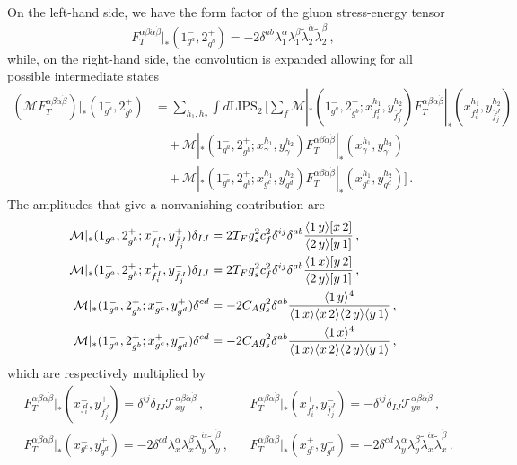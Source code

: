 On the left-hand side, we have the form factor of the gluon stress-energy tensor 
\begin{equation}
    F_T^{\alpha\beta\dot\alpha\dot\beta}|_{*}(1^-_{g^a},2^+_{g^b}) = -2 \delta^{ab} \lambda_1^\alpha \lambda_1^\beta \tilde\lambda_2^{\dot\alpha} \tilde\lambda_2^{\dot\beta}\,,
\end{equation}
while, on the right-hand side, the convolution is expanded allowing for all possible intermediate states
\begin{align}
    (\mathcal M F_T^{\alpha\beta\dot\alpha\dot\beta})|_{*}(1^-_{g^a},2^+_{g^b}) &= \sum_{h_1,h_2}\int d\text{LIPS}_2\,
    \bigg[
    \sum_f  \mathcal M|_{*} (1^-_{g^a},2^+_{g^b}; x_{f_i^I}^{h_1},y_{\bar f_j^J}^{h_2})F_T^{\alpha\beta\dot\alpha\dot\beta}|_{*}(x_{f_i^I}^{h_1},y_{\bar f_j^J}^{h_2})\nonumber \\
    &\quad + \mathcal M|_{*} (1^-_{g^a},2^+_{g^b}; x_\gamma^{h_1},y_\gamma^{h_2})F_T^{\alpha\beta\dot\alpha\dot\beta}|_{*}(x_\gamma^{h_1},y_\gamma^{h_2})\nonumber \\
    &\quad + \mathcal M|_{*} (1^-_{g^a},2^+_{g^b}; x_{g^c}^{h_1},y_{g^d}^{h_2})F_T^{\alpha\beta\dot\alpha\dot\beta}|_{*}(x_{g^c}^{h_1},y_{g^d}^{h_2})
    \bigg]\,.
\end{align}
The amplitudes that give a nonvanishing contribution are
\begin{align}
    \mathcal M|_*(1^-_{g^a},2^+_{g^b};x_{f_i^I}^{-},y_{\bar f_j^J}^{+})\delta_{IJ} &= 2T_Fg_s^2c_f^2\delta^{ij}\delta^{ab}\frac{\langle1\, y \rangle\lbrack x\, 2 \rbrack}{\langle2\, y \rangle\lbrack y\, 1 \rbrack}\,, \\
    \mathcal M|_*(1^-_{g^a},2^+_{g^b};x_{f_i^I}^{+},y_{\bar f_j^J}^{-})\delta_{IJ} &= 2T_Fg_s^2c_f^2\delta^{ij}\delta^{ab}\frac{\langle1\, x \rangle\lbrack y\, 2 \rbrack}{\langle2\, y \rangle\lbrack y\, 1 \rbrack}\,,\\
    \mathcal M|_* (1^-_{g^a},2^+_{g^b};x_{g^c}^{-},y_{g^d}^{+}) \delta^{cd} &= -2C_A g_s^2\delta^{ab}\frac{\langle1\, y \rangle^4}{\langle1\, x \rangle\langle x\, 2 \rangle\langle2\, y \rangle\langle y\, 1 \rangle}\,, \\
    \mathcal M|_* (1^-_{g^a},2^+_{g^b};x_{g^c}^{+},y_{g^d}^{-}) \delta^{cd} &= -2C_A g_s^2\delta^{ab}\frac{\langle1\, x \rangle^4}{\langle1\, x \rangle\langle x\, 2 \rangle\langle2\, y \rangle\langle y\, 1 \rangle}\,,
\end{align}
which are respectively multiplied by
\begin{align}
& 
F_T^{\alpha\beta\dot\alpha\dot\beta}|_{*}(x_{f_i^I}^{-},y_{\bar f_j^J}^{+}) = \delta^{ij}\delta_{IJ}\mathcal{T}_{xy}^{\alpha\beta\dot{\alpha}\dot{\beta}}\,, 
\qquad & &
F_T^{\alpha\beta\dot\alpha\dot\beta}|_{*}(x_{f_i^I}^{+},y_{\bar f_j^J}^{-}) = -\delta^{ij}\delta_{IJ}\mathcal{T}_{yx}^{\alpha\beta\dot{\alpha}\dot{\beta}}\,, 
\\ 
&
F_T^{\alpha\beta\dot\alpha\dot\beta}|_{*}(x_{g^c}^{-},y_{g^d}^{+}) = -2\delta^{cd}\lambda_x^\alpha \lambda_x^\beta \tilde\lambda_y^{\dot\alpha} \tilde\lambda_y^{\dot\beta}\,, 
& & F_T^{\alpha\beta\dot\alpha\dot\beta}|_{*}(x_{g^c}^{+},y_{g^d}^{-}) = -2\delta^{cd}\lambda_y^\alpha \lambda_y^\beta \tilde\lambda_x^{\dot\alpha} \tilde\lambda_x^{\dot\beta}\,.
\end{align}


